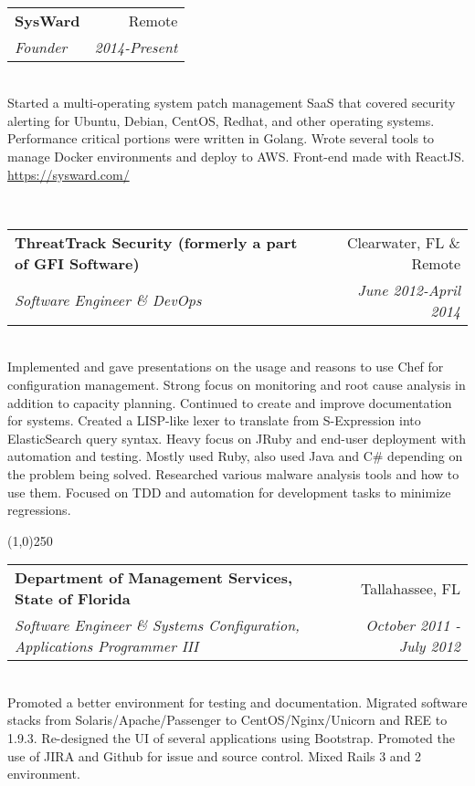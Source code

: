 \documentclass[a4paper,11pt,sans]{article}
\makeatletter
\newcommand{\ressubheading}[4]{
\begin{tabular*}{7.0in}{l@{\extracolsep{\fill}}r}
		\textbf{#1} & #2 \\
		\textit{#3} & \textit{#4} \\
\end{tabular*}\vspace{-6pt}}
\makeatother
\begin{document}
\hspace{5pt} \\

\ressubheading{SysWard}{Remote}{Founder}{2014-Present}

\hspace{5pt} \\

Started a multi-operating system patch management SaaS that covered security alerting for Ubuntu, Debian, CentOS, Redhat, and other operating systems. Performance critical portions were written in Golang. Wrote several tools to manage Docker environments and deploy to AWS. Front-end made with ReactJS. \url{https://sysward.com/}

\hspace{5pt} \\

\ressubheading{ThreatTrack Security (formerly a part of GFI Software)}{Clearwater, FL \& Remote}{Software Engineer \& DevOps}{June 2012-April 2014}

\hspace{5pt} \\
Implemented and gave presentations on the usage and reasons to use Chef for configuration management. Strong focus on monitoring and root cause analysis in addition to capacity planning. Continued to create and improve documentation for systems. Created a
LISP-like lexer to translate from S-Expression into ElasticSearch query syntax. Heavy focus on JRuby and end-user deployment with automation and testing. Mostly used Ruby, also used Java and C\#
depending on the problem being solved. Researched various malware analysis tools and how to use them. Focused on TDD and automation for development tasks to minimize regressions.

\begin{center}
  \line(1,0){250}
\end{center}


\ressubheading{Department of Management Services, State of Florida}{Tallahassee, FL}{Software Engineer \& Systems Configuration, Applications Programmer III}{October 2011 - July 2012}

\hspace{5pt} \\

Promoted a better environment for testing and documentation. Migrated software stacks from Solaris/Apache/Passenger to CentOS/Nginx/Unicorn and REE to 1.9.3.
Re-designed the UI of several applications using Bootstrap. Promoted the use of JIRA and Github for issue and source control. Mixed Rails 3 and 2 environment.
\end{document}
